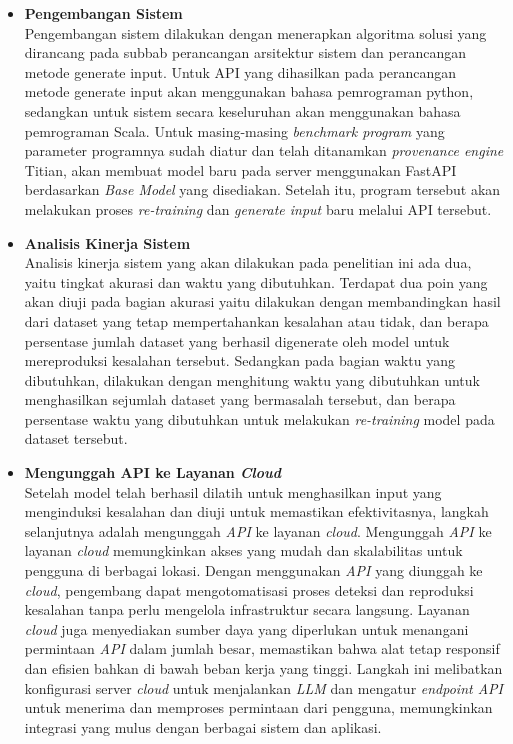 \begin{itemize}[topsep=0pt]
  \item \textbf{Pengembangan Sistem}\\
  Pengembangan sistem dilakukan dengan menerapkan algoritma
  solusi yang dirancang pada subbab perancangan arsitektur
  sistem dan perancangan metode generate input. Untuk API
  yang dihasilkan pada perancangan metode generate input
  akan menggunakan bahasa pemrograman python, sedangkan
  untuk sistem secara keseluruhan akan menggunakan bahasa
  pemrograman Scala. Untuk masing-masing \emph{benchmark program}
  yang parameter programnya sudah diatur dan telah ditanamkan
  \emph{provenance engine} Titian, akan membuat model baru 
  pada server menggunakan FastAPI berdasarkan \emph{Base Model} 
  yang disediakan. Setelah itu, program tersebut akan melakukan 
  proses \emph{re-training} dan \emph{generate input} baru melalui 
  API tersebut.

  \item \textbf{Analisis Kinerja Sistem}\\
  Analisis kinerja sistem yang akan dilakukan pada penelitian 
  ini ada dua, yaitu tingkat akurasi dan waktu yang dibutuhkan. 
  Terdapat dua poin yang akan diuji pada bagian akurasi yaitu 
  dilakukan dengan membandingkan hasil dari dataset yang tetap 
  mempertahankan kesalahan atau tidak, dan berapa persentase
  jumlah dataset yang berhasil digenerate oleh model untuk
  mereproduksi kesalahan tersebut. Sedangkan pada bagian waktu
  yang dibutuhkan, dilakukan dengan menghitung waktu yang
  dibutuhkan untuk menghasilkan sejumlah dataset yang bermasalah 
  tersebut, dan berapa persentase waktu yang dibutuhkan untuk
  melakukan \emph{re-training} model pada dataset tersebut.

  \item \textbf{Mengunggah API ke Layanan \emph{Cloud}}\\
  Setelah model telah berhasil dilatih untuk menghasilkan 
  input yang menginduksi kesalahan dan diuji untuk memastikan 
  efektivitasnya, langkah selanjutnya adalah mengunggah 
  \emph{API} ke layanan \emph{cloud}. Mengunggah \emph{API} 
  ke layanan \emph{cloud} memungkinkan akses yang mudah dan 
  skalabilitas untuk pengguna di berbagai lokasi. Dengan 
  menggunakan \emph{API} yang diunggah ke \emph{cloud}, 
  pengembang dapat mengotomatisasi proses deteksi dan 
  reproduksi kesalahan tanpa perlu mengelola infrastruktur 
  secara langsung. Layanan \emph{cloud} juga menyediakan 
  sumber daya yang diperlukan untuk menangani permintaan 
  \emph{API} dalam jumlah besar, memastikan bahwa alat 
  tetap responsif dan efisien bahkan di bawah beban kerja 
  yang tinggi. Langkah ini melibatkan konfigurasi server 
  \emph{cloud} untuk menjalankan \emph{LLM} dan mengatur 
  \emph{endpoint API} untuk menerima dan memproses permintaan 
  dari pengguna, memungkinkan integrasi yang mulus dengan 
  berbagai sistem dan aplikasi.

\end{itemize}

